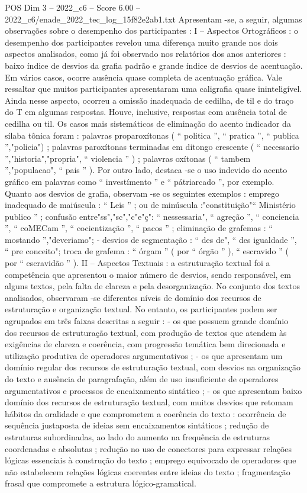\begin{textsample}{POS Dim 3 – 2022\_c6 – Score 6.00 – 2022\_c6/enade\_2022\_tec\_log\_15f82e2ab1.txt}
Apresentam -se, a seguir, algumas observações sobre o desempenho dos participantes : I – Aspectos Ortográficos : o desempenho dos participantes revelou uma diferença muito grande nos dois aspectos analisados, como já foi observado nos relatórios dos anos anteriores : baixo índice de desvios da grafia padrão e grande índice de desvios de acentuação.
Em vários casos, ocorre ausência quase completa de acentuação gráfica.
Vale ressaltar que muitos participantes apresentaram uma caligrafia quase ininteligível.
Ainda nesse aspecto, ocorreu a omissão inadequada de cedilha, de til e do traço do T em algumas respostas.
Houve, inclusive, respostas com ausência total de cedilha ou til.
Os casos mais sistemáticos de eliminação do acento indicador da sílaba tônica foram : palavras proparoxítonas ( “ politica ”, “ pratica ”, “ publica ”,"policia") ; palavras paroxítonas terminadas em ditongo crescente ( “ necessario ”,"historia","propria", “ violencia ” ) ; palavras oxítonas ( “ tambem ”,"populacao", “ pais ” ).
Por outro lado, destaca -se o uso indevido do acento gráfico em palavras como “ investímento ” e “ pátriarcado ”, por exemplo.
Quanto aos desvios de grafia, observam -se os seguintes exemplos : emprego inadequado de maiúscula : “ Leis ” ; ou de minúscula :"constituição"“ Ministério publico ” ; confusão entre"ss","sc","c"e"ç": “ nessessaria", “ agreção ”, “ conciencia ”, “ coMECam ”, “ cocientização ”, “ pacos ” ; eliminação de grafemas : “ mostando ”,"deveriamo"; - desvios de segmentação : “ des de", “ des igualdade ”, “ pre conceito"; troca de grafema : “ órgam ” ( por “ órgão ” ), “ escravido ” ( por “ escravidão ” ).
II – Aspectos Textuais : a estruturação textual foi a competência que apresentou o maior número de desvios, sendo responsável, em alguns textos, pela falta de clareza e pela desorganização.
No conjunto dos textos analisados, observaram -se diferentes níveis de domínio dos recursos de estruturação e organização textual.
No entanto, os participantes podem ser agrupados em três faixas descritas a seguir : - os que possuem grande domínio dos recursos de estruturação textual, com produção de textos que atendem às exigências de clareza e coerência, com progressão temática bem direcionada e utilização produtiva de operadores argumentativos ; - os que apresentam um domínio regular dos recursos de estruturação textual, com desvios na organização do texto e ausência de paragrafação, além de uso insuficiente de operadores argumentativos e processos de encaixamento sintático ; - os que apresentam baixo domínio dos recursos de estruturação textual, com muitos desvios que retomam hábitos da oralidade e que comprometem a coerência do texto : ocorrência de sequência justaposta de ideias sem encaixamentos sintáticos ; redução de estruturas subordinadas, ao lado do aumento na frequência de estruturas coordenadas e absolutas ; redução no uso de conectores para expressar relações lógicas essenciais à construção do texto ; emprego equivocado de operadores que não estabelecem relações lógicas coerentes entre ideias do texto ; fragmentação frasal que compromete a estrutura lógico-gramatical.

\end{textsample}
